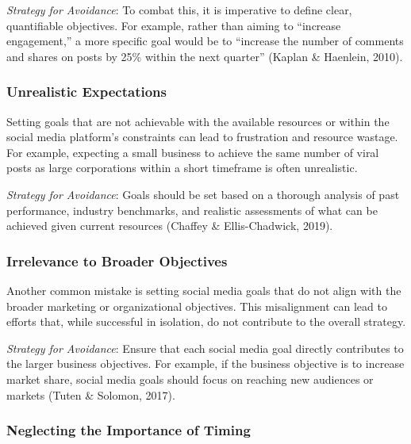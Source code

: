\documentclass[
]{book}
\begin{document}
\emph{Strategy for Avoidance}: To combat this, it is imperative to define clear, quantifiable objectives. For example, rather than aiming to ``increase engagement,'' a more specific goal would be to ``increase the number of comments and shares on posts by 25\% within the next quarter'' (Kaplan \& Haenlein, 2010).

\hypertarget{unrealistic-expectations}{%
\subsubsection*{Unrealistic Expectations}\label{unrealistic-expectations}}

Setting goals that are not achievable with the available resources or within the social media platform's constraints can lead to frustration and resource wastage. For example, expecting a small business to achieve the same number of viral posts as large corporations within a short timeframe is often unrealistic.

\emph{Strategy for Avoidance}: Goals should be set based on a thorough analysis of past performance, industry benchmarks, and realistic assessments of what can be achieved given current resources (Chaffey \& Ellis-Chadwick, 2019).

\hypertarget{irrelevance-to-broader-objectives}{%
\subsubsection*{Irrelevance to Broader Objectives}\label{irrelevance-to-broader-objectives}}

Another common mistake is setting social media goals that do not align with the broader marketing or organizational objectives. This misalignment can lead to efforts that, while successful in isolation, do not contribute to the overall strategy.

\emph{Strategy for Avoidance}: Ensure that each social media goal directly contributes to the larger business objectives. For example, if the business objective is to increase market share, social media goals should focus on reaching new audiences or markets (Tuten \& Solomon, 2017).

\hypertarget{neglecting-the-importance-of-timing}{%
\subsubsection*{Neglecting the Importance of Timing}\label{neglecting-the-importance-of-timing}}
\end{document}
